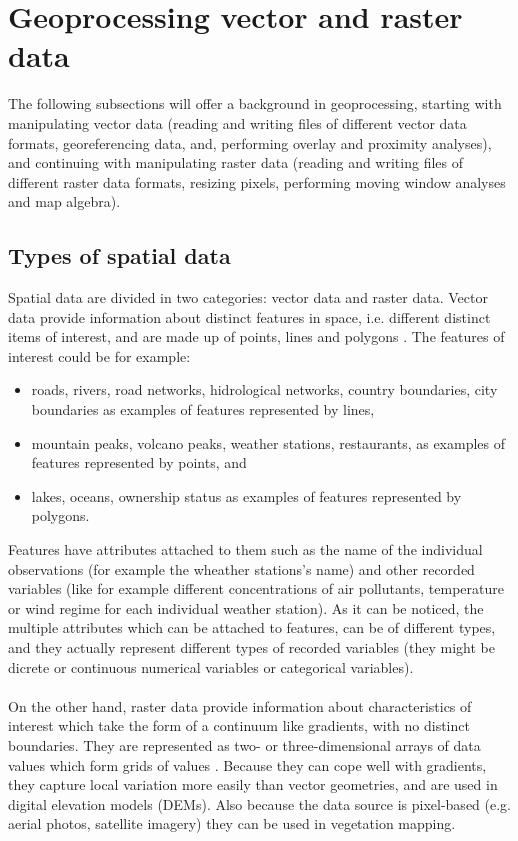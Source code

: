 \documentclass {article}
\begin{document}
\section{Geoprocessing vector and raster data}
The following subsections will offer a background in geoprocessing, starting with manipulating vector data (reading and writing files of different vector data formats, georeferencing data, and, performing overlay and proximity analyses), and continuing with manipulating raster data (reading and writing files of different raster data formats, resizing pixels, performing moving window analyses and map algebra).    

\subsection {Types of spatial data}

Spatial data are divided in two categories: vector data and raster data. Vector data provide information about distinct features in space, i.e. different distinct items of interest, and are made up of points, lines and polygons \cite{garrard_geoprocessing_2016}. The features of interest could be for example:
\begin{itemize}
\item roads, rivers, road networks, hidrological networks, country boundaries, city boundaries as examples of features represented by lines,
\item  mountain peaks, volcano peaks, weather stations, restaurants, as examples of features represented by points, and 
\item lakes, oceans, ownership status as examples of features represented by polygons.     
\end{itemize}
Features have attributes attached to them such as the name of the individual observations (for example the wheather stations's name) and other recorded variables (like for example different concentrations of air pollutants, temperature or wind regime for each individual weather station). As it can be noticed, the multiple attributes which can be attached to features, can be of different types, and they actually represent different types of recorded variables (they might be dicrete or continuous numerical variables or categorical variables). \\ 
\\
On the other hand, raster data provide information about characteristics of interest which take the form of a continuum like gradients, with no distinct boundaries. They are represented as two- or three-dimensional arrays of data values which form grids of values \cite{garrard_geoprocessing_2016}.
Because they can cope well with gradients, they capture local variation more easily than vector geometries, and are used in digital elevation models (DEMs). Also because the data source is pixel-based (e.g. aerial photos, satellite imagery) they can be used in vegetation mapping.     
\end{document}
